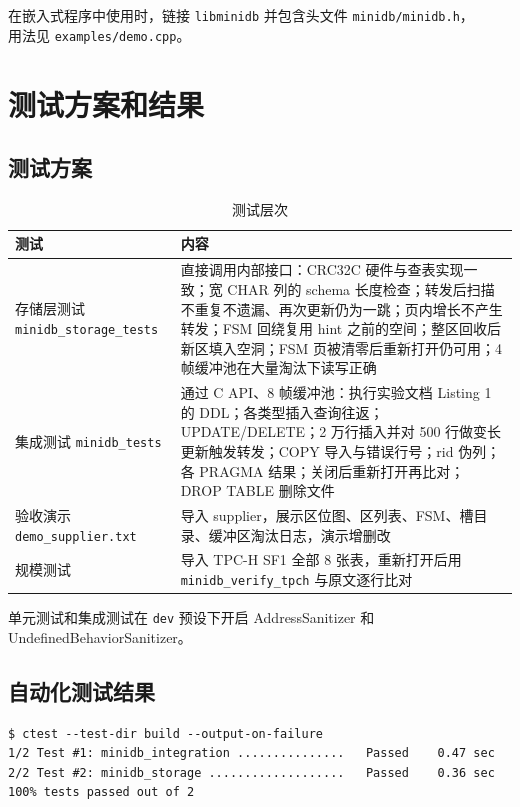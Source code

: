 \documentclass[11pt,a4paper]{ctexart}
\newcommand{\code}[1]{\texttt{#1}}
\begin{document}
在嵌入式程序中使用时，链接 \code{libminidb} 并包含头文件 \code{minidb/minidb.h}，\\用法见 \code{examples/demo.cpp}。

\section{测试方案和结果}

\subsection{测试方案}

\begin{table}[H]
  \centering
  \caption{测试层次}
  \begin{tabularx}{\textwidth}{l X}
    \toprule
    测试 & 内容 \\
    \midrule
    存储层测试 \code{minidb\_storage\_tests} & 直接调用内部接口：CRC32C 硬件与查表实现一致；宽 CHAR 列的 schema 长度检查；转发后扫描不重复不遗漏、再次更新仍为一跳；页内增长不产生转发；FSM 回绕复用 hint 之前的空间；整区回收后新区填入空洞；FSM 页被清零后重新打开仍可用；4 帧缓冲池在大量淘汰下读写正确 \\
    集成测试 \code{minidb\_tests} & 通过 C API、8 帧缓冲池：执行实验文档 Listing 1 的 DDL；各类型插入查询往返；UPDATE/DELETE；2 万行插入并对 500 行做变长更新触发转发；COPY 导入与错误行号；rid 伪列；各 PRAGMA 结果；关闭后重新打开再比对；DROP TABLE 删除文件 \\
    验收演示 \code{demo\_supplier.txt} & 导入 supplier，展示区位图、区列表、FSM、槽目录、缓冲区淘汰日志，演示增删改 \\
    规模测试 & 导入 TPC-H SF1 全部 8 张表，重新打开后用 \code{minidb\_verify\_tpch} 与原文逐行比对 \\
    \bottomrule
  \end{tabularx}
\end{table}

单元测试和集成测试在 \code{dev} 预设下开启 AddressSanitizer 和 UndefinedBehaviorSanitizer。

\subsection{自动化测试结果}

\begin{lstlisting}[style=plain]
$ ctest --test-dir build --output-on-failure
1/2 Test #1: minidb_integration ...............   Passed    0.47 sec
2/2 Test #2: minidb_storage ...................   Passed    0.36 sec
100% tests passed out of 2
\end{lstlisting}
\end{document}
